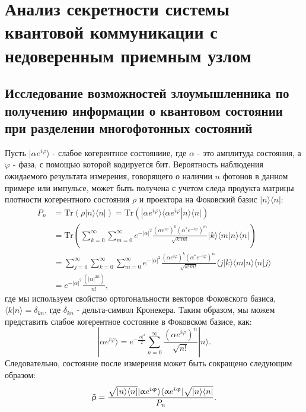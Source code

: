 \chapter{Анализ секретности системы квантовой коммуникации с недоверенным приемным узлом} \label{ch:ch6}
\section{Исследование возможностей злоумышленника по получению информации о квантовом состоянии при разделении многофотонных состояний} \label{sec:ch6/sec1}

Пусть $|\alpha e^{i \varphi}\rangle$ - слабое когерентное состояниие, где $\alpha$ - это амплитуда состояния, а $\varphi$ - фаза, с помощью которой кодируется бит. Вероятность наблюдения ожидаемого результата измерения, говорящего о наличии $n$ фотонов в данном примере или импульсе, может быть получена с учетом следа продукта матрицы плотности когерентного состояния $\rho$ и проектора на Фоковский базис $|n\rangle\langle n|$: 
%
\begin{align}
    P_n&=\text{Tr}(\rho |n\rangle\langle n|) = \text{Tr}(|\alpha e^{i \varphi}\rangle \langle\alpha e^{i \varphi} |n\rangle\langle n|) \nonumber \\
    &= \text{Tr}(\sum_{k=0}^{\infty}\sum_{m=0}^{\infty} e^{-|\alpha|^2} \frac{(\alpha e^{i \varphi})^k(\alpha^{*} e^{-i \varphi})^m}{\sqrt{k!m!}} |k\rangle\langle m |n\rangle\langle n|) \nonumber  \\
    &=\sum_{j=0}^{\infty}\sum_{k=0}^{\infty}\sum_{m=0}^{\infty} e^{-|\alpha|^2} \frac{(\alpha e^{i \varphi})^k(\alpha^{*} e^{-i \varphi})^m}{\sqrt{k!m!}}\langle j |k\rangle\langle m |n\rangle\langle n|j\rangle \nonumber  \\
    &=e^{-|\alpha|^2} \frac{(|\alpha|^{2n})}{n!}, \label{pnver}
\end{align}
% 
где мы используем свойство ортогональности векторов Фоковского базиса, $\langle k| n \rangle = \delta_{kn}$, где $\delta_{kn}$ - дельта-символ Кронекера. Таким образом, мы можем представить слабое когерентное состояние в Фоковском базисе, как:
%
\begin{equation}
    |\alpha e^{i \varphi}\rangle = e^{-\frac{|\alpha|^2}{2}}\sum_{n=0}^{\infty}  \frac{(\alpha e^{i \varphi})^n}{\sqrt{n!}} |n\rangle.
\end{equation}
%
Следовательно, состояние после измерения может быть сокращено следующим образом:
%
\begin{equation}
    \Tilde{\rho}=\frac{\sqrt{|n\rangle\langle n|} |\alpha e^{i \varphi}\rangle \langle\alpha e^{i \varphi} | \sqrt{|n\rangle\langle n|}}{P_n}.
\end{equation}
